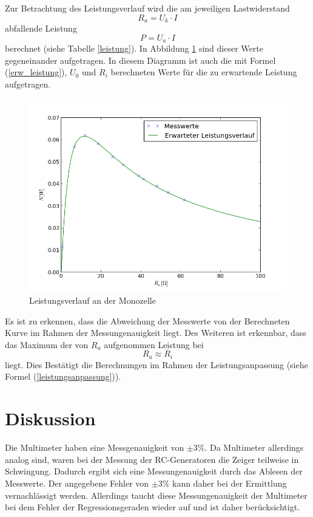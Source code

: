 \documentclass[11pt,ngerman,a4paper]{article}
\begin{document}
Zur Betrachtung des Leistungsverlauf wird die am jeweiligen Lastwiderstand 
\begin{equation}
R_a = U_k \cdot I
\end{equation}
 abfallende Leistung
\begin{equation}
P = U_a\cdot  I
\end{equation}
berechnet (siehe Tabelle \ref{leistung}). In Abbildung \ref{Plot4} sind dieser Werte gegeneinander aufgetragen. In diesem Diagramm ist auch die mit Formel (\ref{erw_leistung}), $U_0$ und $R_i$ berechneten Werte f\"ur die zu erwartende Leistung aufgetragen.
\begin{figure}
\centering
\includegraphics[scale=1.00]{Plot4.png}
\caption{Leistungsverlauf an der Monozelle}
\label{Plot4}
\end{figure}
Es ist zu erkennen, dass die Abweichung der Messwerte von der Berechneten Kurve im Rahmen der Messungenauigkeit liegt. Des Weiteren ist erkennbar, dass das Maximum der von $R_a$ aufgenommen Leistung bei 
\[
R_a \approx R_i
\]
liegt. Dies Best\"atigt die Berechnungen im Rahmen der Leistungsanpassung (siehe Formel (\ref{leistungsanpassung})).
\section{Diskussion}
Die Multimeter haben eine Messgenauigkeit von $\pm 3 \%$. Da Multimeter allerdings analog sind, waren bei der Messung der RC-Generatoren die Zeiger teilweise in Schwingung. Dadurch ergibt sich eine Messungenauigkeit durch das Ablesen der Messwerte. Der angegebene Fehler von $\pm 3 \%$ kann daher bei der Ermittlung vernachlässigt werden. Allerdings taucht diese Messungenauigkeit der Multimeter bei dem Fehler der Regressionsgeraden wieder auf und ist daher berücksichtigt.
 
\end{document}
